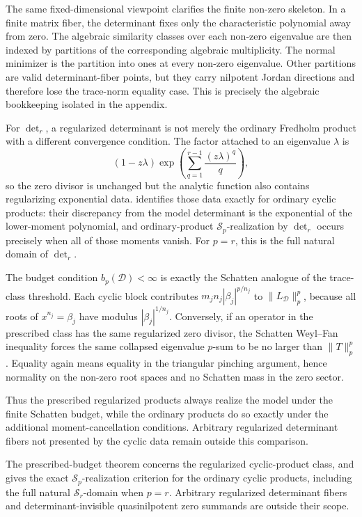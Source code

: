 The same fixed-dimensional viewpoint clarifies the finite non-zero skeleton.
In a finite matrix fiber, the determinant fixes only the characteristic
polynomial away from zero.  The algebraic similarity classes over each
non-zero eigenvalue are then indexed by partitions of the corresponding
algebraic multiplicity.  The normal minimizer is the partition into ones at
every non-zero eigenvalue.  Other partitions are valid determinant-fiber
points, but they carry nilpotent Jordan directions and therefore lose the
trace-norm equality case.  This is precisely the algebraic bookkeeping isolated
in the appendix.

For \(\det_r\), a regularized determinant is not merely the ordinary Fredholm
product with a different convergence condition.  The factor attached
to an eigenvalue \(\lambda\) is
\[
  (1-z\lambda)
  \exp\left(\sum_{q=1}^{r-1}\frac{(z\lambda)^q}{q}\right),
\]
so the zero divisor is unchanged but the analytic function also contains
regularizing exponential data.  
identifies those data exactly for ordinary cyclic products: their discrepancy
from the model determinant is the exponential of the lower-moment polynomial,
and ordinary-product \(\mathcal S_p\)-realization by \(\det_r\) occurs
precisely when all of those moments vanish.  For \(p=r\), this is the full
natural domain of \(\det_r\).

The budget condition \(b_p(\mathcal D)<\infty\) is exactly the Schatten analogue
of the trace-class threshold.  Each cyclic block contributes
\(m_j n_j|\beta_j|^{p/n_j}\) to \(\|L_{\mathcal D}\|_p^p\), because all roots of
\(x^{n_j}=\beta_j\) have modulus \(|\beta_j|^{1/n_j}\).  Conversely, if an
operator in the prescribed class has the same regularized zero divisor, the
Schatten Weyl--Fan inequality forces the same collapsed eigenvalue
\(p\)-sum to be no larger than \(\|T\|_p^p\).  Equality again means equality in
the triangular pinching argument, hence normality on the non-zero root spaces
and no Schatten mass in the zero sector.

Thus the prescribed regularized products always realize the model under the
finite Schatten budget, while the ordinary products do so exactly under the
additional moment-cancellation conditions.  Arbitrary regularized determinant
fibers not presented by the cyclic data remain outside this comparison.

\begin{proposition}
  \label{prop:regularized-domain-boundary}
  The prescribed-budget theorem concerns the regularized cyclic-product class,
  and  gives the exact
  \(\mathcal S_p\)-realization criterion for the ordinary cyclic products,
  including the full natural \(\mathcal S_r\)-domain when \(p=r\).  Arbitrary
  regularized determinant fibers and determinant-invisible quasinilpotent
  zero summands are outside their scope.
\end{proposition}

